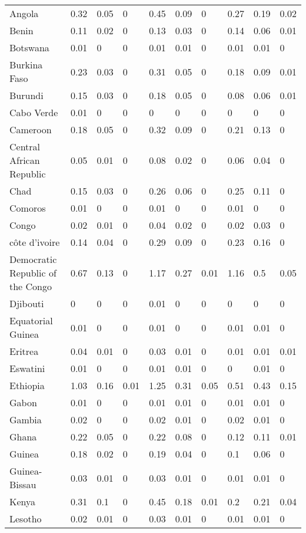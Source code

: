 \begin{longtable}[t]{llllllllll}
Angola & 0.32 & 0.05 & 0 & 0.45 & 0.09 & 0 & 0.27 & 0.19 & 0.02\\
Benin & 0.11 & 0.02 & 0 & 0.13 & 0.03 & 0 & 0.14 & 0.06 & 0.01\\
Botswana & 0.01 & 0 & 0 & 0.01 & 0.01 & 0 & 0.01 & 0.01 & 0\\
Burkina Faso & 0.23 & 0.03 & 0 & 0.31 & 0.05 & 0 & 0.18 & 0.09 & 0.01\\
Burundi & 0.15 & 0.03 & 0 & 0.18 & 0.05 & 0 & 0.08 & 0.06 & 0.01\\
Cabo Verde & 0.01 & 0 & 0 & 0 & 0 & 0 & 0 & 0 & 0\\
Cameroon & 0.18 & 0.05 & 0 & 0.32 & 0.09 & 0 & 0.21 & 0.13 & 0\\
Central African Republic & 0.05 & 0.01 & 0 & 0.08 & 0.02 & 0 & 0.06 & 0.04 & 0\\
Chad & 0.15 & 0.03 & 0 & 0.26 & 0.06 & 0 & 0.25 & 0.11 & 0\\
Comoros & 0.01 & 0 & 0 & 0.01 & 0 & 0 & 0.01 & 0 & 0\\
Congo & 0.02 & 0.01 & 0 & 0.04 & 0.02 & 0 & 0.02 & 0.03 & 0\\
côte d'ivoire & 0.14 & 0.04 & 0 & 0.29 & 0.09 & 0 & 0.23 & 0.16 & 0\\
Democratic Republic of the Congo & 0.67 & 0.13 & 0 & 1.17 & 0.27 & 0.01 & 1.16 & 0.5 & 0.05\\
Djibouti & 0 & 0 & 0 & 0.01 & 0 & 0 & 0 & 0 & 0\\
Equatorial Guinea & 0.01 & 0 & 0 & 0.01 & 0 & 0 & 0.01 & 0.01 & 0\\
Eritrea & 0.04 & 0.01 & 0 & 0.03 & 0.01 & 0 & 0.01 & 0.01 & 0.01\\
Eswatini & 0.01 & 0 & 0 & 0.01 & 0.01 & 0 & 0 & 0.01 & 0\\
Ethiopia & 1.03 & 0.16 & 0.01 & 1.25 & 0.31 & 0.05 & 0.51 & 0.43 & 0.15\\
Gabon & 0.01 & 0 & 0 & 0.01 & 0.01 & 0 & 0.01 & 0.01 & 0\\
Gambia & 0.02 & 0 & 0 & 0.02 & 0.01 & 0 & 0.02 & 0.01 & 0\\
Ghana & 0.22 & 0.05 & 0 & 0.22 & 0.08 & 0 & 0.12 & 0.11 & 0.01\\
Guinea & 0.18 & 0.02 & 0 & 0.19 & 0.04 & 0 & 0.1 & 0.06 & 0\\
Guinea-Bissau & 0.03 & 0.01 & 0 & 0.03 & 0.01 & 0 & 0.01 & 0.01 & 0\\
Kenya & 0.31 & 0.1 & 0 & 0.45 & 0.18 & 0.01 & 0.2 & 0.21 & 0.04\\
Lesotho & 0.02 & 0.01 & 0 & 0.03 & 0.01 & 0 & 0.01 & 0.01 & 0\\

\end{longtable}
